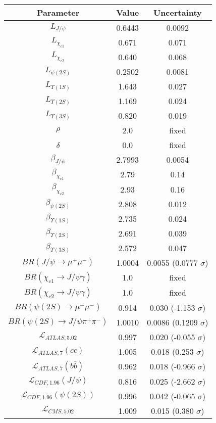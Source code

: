 \begin{table}[h!]
\centering
\begin{tabular}{c|c|c}
Parameter & Value & Uncertainty \\
\hline
$L_{J/\psi}$ & 0.6443 & 0.0092 \\
$L_{\chi_{c1}}$ & 0.671 & 0.071 \\
$L_{\chi_{c2}}$ & 0.640 & 0.068 \\
$L_{\psi(2S)}$ & 0.2502 & 0.0081 \\
$L_{\Upsilon(1S)}$ & 1.643 & 0.027 \\
$L_{\Upsilon(2S)}$ & 1.169 & 0.024 \\
$L_{\Upsilon(3S)}$ & 0.820 & 0.019 \\
$\rho$ & 2.0 & fixed \\
$\delta$ & 0.0 & fixed \\
$\beta_{J/\psi}$ & 2.7993 & 0.0054 \\
$\beta_{\chi_{c1}}$ & 2.79 & 0.14 \\
$\beta_{\chi_{c2}}$ & 2.93 & 0.16 \\
$\beta_{\psi(2S)}$ & 2.808 & 0.012 \\
$\beta_{\Upsilon(1S)}$ & 2.735 & 0.024 \\
$\beta_{\Upsilon(2S)}$ & 2.691 & 0.039 \\
$\beta_{\Upsilon(3S)}$ & 2.572 & 0.047 \\
$BR(J/\psi\rightarrow\mu^+\mu^-)$ & 1.0004 & 0.0055 (0.0777 $\sigma$) \\
$BR(\chi_{c1}\rightarrow J/\psi\gamma)$ & 1.0 & fixed \\
$BR(\chi_{c2}\rightarrow J/\psi\gamma)$ & 1.0 & fixed \\
$BR(\psi(2S)\rightarrow\mu^+\mu^-)$ & 0.914 & 0.030 (-1.153 $\sigma$) \\
$BR(\psi(2S)\rightarrow J/\psi\pi^+\pi^-)$ & 1.0010 & 0.0086 (0.1209 $\sigma$) \\
$\mathcal L_{ATLAS,5.02}$ & 0.997 & 0.020 (-0.055 $\sigma$) \\
$\mathcal L_{ATLAS,7}(c\overline c)$ & 1.005 & 0.018 (0.253 $\sigma$) \\
$\mathcal L_{ATLAS,7}(b\overline b)$ & 0.962 & 0.018 (-0.966 $\sigma$) \\
$\mathcal L_{CDF,1.96}(J/\psi)$ & 0.816 & 0.025 (-2.662 $\sigma$) \\
$\mathcal L_{CDF,1.96}(\psi(2S))$ & 0.996 & 0.042 (-0.065 $\sigma$) \\
$\mathcal L_{CMS,5.02}$ & 1.009 & 0.015 (0.380 $\sigma$) \\

\end{tabular}
\end{table}
